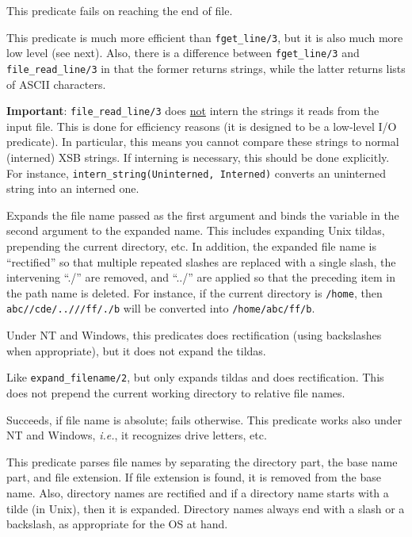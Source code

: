 \begin{description}
    This predicate fails on reaching the end of file.

    This predicate is much more efficient than {{\tt fget\_line/3}}, but it
    is also much more low level (see next). Also, there is a difference
    between {{\tt fget\_line/3}} and {\tt file\_read\_line/3} in that the
    former returns strings, while the latter returns lists of ASCII
    characters.
    
    {\bf Important}: {\tt file\_read\_line/3} does \underline{not} intern
    the strings it reads from the input file. This is done for efficiency
    reasons (it is designed to be a low-level I/O predicate).  In
    particular, this means you cannot compare these strings to normal
    (interned) XSB strings. If interning is necessary, this should be done
    explicitly. For instance, {\tt intern\_string(Uninterned, Interned)}
    converts an uninterned string into an interned one.

Expands the file name passed as the first argument and binds the variable
in the second argument to the expanded name. This includes expanding Unix
tildas, prepending the current directory, etc. In addition, the expanded
file name is ``rectified'' so that multiple repeated slashes are replaced
with a single slash, the intervening ``./'' are removed, and ``../'' are
applied so that the preceding item in the path name is deleted. For
instance, if the current directory is {\tt /home}, then {\tt
  abc//cde/..///ff/./b} will be converted into {\tt /home/abc/ff/b}.

Under NT and Windows, this predicates does rectification (using
backslashes when appropriate), but it does not expand the tildas.

Like {\tt expand\_filename/2}, but only expands tildas and does
rectification. This does not prepend the current working directory to
relative file names.

  Succeeds, if file name is absolute; fails
otherwise.  This predicate works also under NT and Windows, {\it
i.e.}, it recognizes drive letters, etc.

This predicate parses file names by separating the directory part, the base
name part, and file extension. If file extension is found, it is removed
from the base name. Also, directory names are rectified and if a directory
name starts with a tilde (in Unix), then it is expanded. Directory names
always end with a slash or a backslash, as appropriate for the OS at hand.


\end{description}

